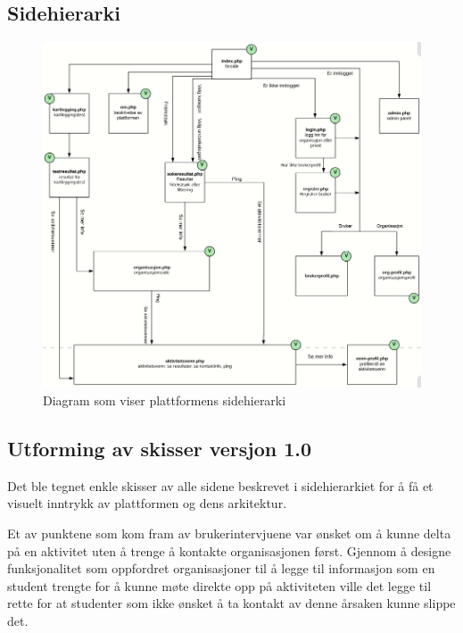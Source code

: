 \subsection{Sidehierarki}
\begin{figure}[H]
\includegraphics[width=\textwidth]{Illustrasjoner/trehierarki.png}
\caption{Diagram som viser plattformens sidehierarki}
\label{fig:trehierarki}
\end{figure}


\subsection{Utforming av skisser versjon 1.0}

Det ble tegnet enkle skisser av alle sidene beskrevet i sidehierarkiet for å få et visuelt inntrykk av plattformen og dens arkitektur.

Et av punktene som kom fram av brukerintervjuene var ønsket om å kunne delta på en aktivitet uten å trenge å kontakte organisasjonen først. Gjennom å designe funksjonalitet som oppfordret organisasjoner til å legge til informasjon som en student trengte for å kunne møte direkte opp på aktiviteten ville det legge til rette for at studenter som ikke ønsket å ta kontakt av denne årsaken kunne slippe det.


